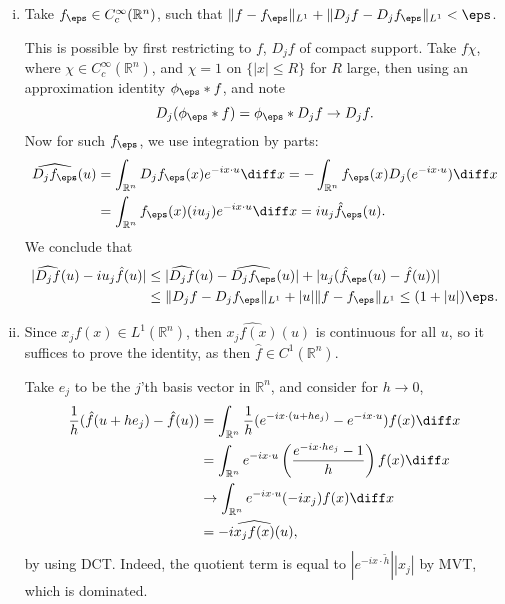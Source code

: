 \documentclass[12pt]{article}
\begin{document}
\begin{proofbox}


	\begin{enumerate}[(i)]
		\item Take $f_\eps \in C^\infty_c(\mathbb{R}^n)$, such that $\|f - f_\eps\|_{L^1} +  \|D_j f - D_j f_\eps\|_{L^1} < \eps$.

			This is possible by first restricting to $f$, $D_j f$ of compact support. Take $f \chi$, where $\chi \in C^\infty_c(\mathbb{R}^n)$, and $\chi = 1$ on $\{|x| \leq R\}$ for $R$ large, then using an approximation identity $\phi_\eps \ast f$, and note
			\[
			D_j(\phi_\eps \ast f) = \phi_\eps \ast D_j f \to D_j f.
			\]
			Now for such $f_\eps$, we use integration by parts:
			\begin{align*}
				\widehat{D_j f_\eps} (u) &= \int_{\mathbb{R}^n} D_j f_\eps (x) e^{-i x \cdot u} \diff x = - \int_{\mathbb{R}^n} f_\eps (x) D_j (e^{-i x \cdot u}) \diff x \\
							 &= \int_{\mathbb{R}^n} f_\eps(x) (i u_j) e^{-i x \cdot u}\diff x = i u_j \hat f_\eps (u).
			\end{align*}
			We conclude that
			\begin{align*}
				|\widehat{D_j f}(u) - i u_j \hat f(u)| &\leq |\widehat{D_j f}(u) - \widehat{D_j f_\eps}(u)| + |u_j(\hat f_\eps (u) - \hat f (u)) | \\
								       &\leq \|D_j f - D_j f_\eps\|_{L^1} + |u| \|f - f_\eps\|_{L^1} \leq (1 + |u|) \eps.
			\end{align*}
		\item Since $x_j f(x) \in L^1(\mathbb{R}^n)$, then $\widehat{x_j f(x)}(u)$ is continuous for all $u$, so it suffices to prove the identity, as then $\hat f \in C^1(\mathbb{R}^n)$.

			Take $e_j$ to be the $j$'th basis vector in $\mathbb{R}^n$, and consider for $h \to 0$,
			\begin{align*}
				\frac 1h (\hat f(u + h e_j) - \hat f(u)) &= \int_{\mathbb{R}^n} \frac{1}{h} (e^{-ix \cdot(u + h e_j)} - e^{-i x \cdot u} ) f(x) \diff x \\
									 &= \int_{\mathbb{R}^n} e^{-ix \cdot u} \left( \frac{e^{-ix \cdot he_j} - 1}{h} \right) f(x) \diff x \\
									 &\to \int_{\mathbb{R}^n} e^{-ix \cdot u} (-i x_j) f(x) \diff x \\
									 &= -i \widehat{x_j f(x)}(u),
			\end{align*}
			by using DCT. Indeed, the quotient term is equal to $|e^{-i x \cdot \tilde h}| |x_j|$ by MVT, which is dominated.
	\end{enumerate}
\end{proofbox}
\end{document}
